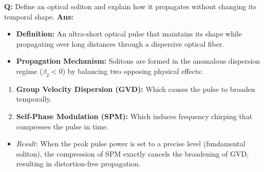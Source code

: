 \documentclass[10pt,a4paper,twocolumn]{article}
\begin{document}
\begin{tcolorbox}[
  colback=white,
  colframe=UnitColorSix,
  colbacktitle=gray!10!white,
  coltitle=black,
  fonttitle=\bfseries\sffamily\small,
  title={Unit VI $\bullet$ Card 5: Optical Solitons},
  boxrule=1.2pt,
  arc=2mm,
  outer arc=2mm,
  boxsep=1.5mm,
  top=1mm,
  bottom=1mm,
  left=1.5mm,
  right=1.5mm,
  before skip=2.5mm,
  after skip=2.5mm
]
\textbf{Q:} Define an optical soliton and explain how it propagates without changing its temporal shape.
\tcbline
\textbf{Ans:} \begin{itemize}
  \item   \textbf{Definition:} An ultra-short optical pulse that maintains its shape while propagating over long distances through a dispersive optical fiber.
  \item   \textbf{Propagation Mechanism:} Solitons are formed in the anomalous dispersion regime ($\beta_2 < 0$) by balancing two opposing physical effects:
\end{itemize}
\begin{enumerate}
  \item \textbf{Group Velocity Dispersion (GVD):} Which causes the pulse to broaden temporally.
  \item \textbf{Self-Phase Modulation (SPM):} Which induces frequency chirping that compresses the pulse in time.
\end{enumerate}
\begin{itemize}
  \item   \textit{Result:} When the peak pulse power is set to a precise level (fundamental soliton), the compression of SPM exactly cancels the broadening of GVD, resulting in distortion-free propagation.
\end{itemize}
\end{tcolorbox}
\end{document}
